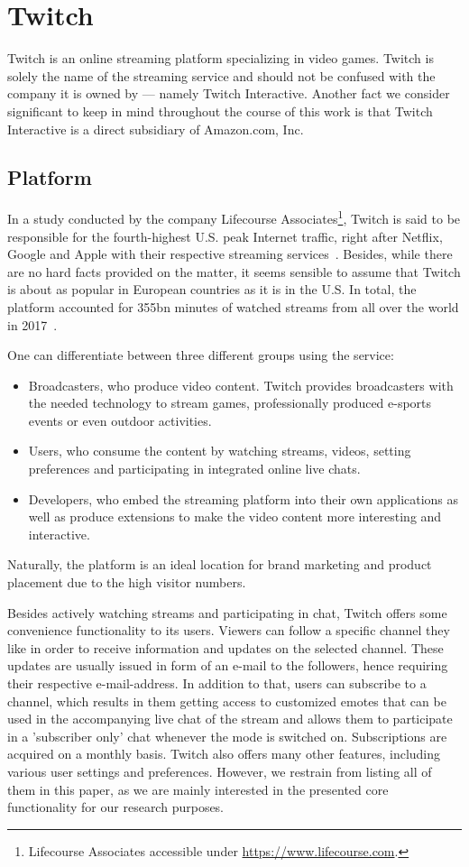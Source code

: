 \section{Twitch}
Twitch is an online streaming platform specializing in video games. 
Twitch is solely the name of the streaming service and should not be confused with the company it is owned by --- namely Twitch Interactive. Another fact we consider significant to keep in mind throughout the course of this work is that Twitch Interactive is a direct subsidiary of Amazon.com, Inc. 

\subsection{Platform}
In a study conducted by the company Lifecourse Associates\footnote{Lifecourse Associates accessible under \url{https://www.lifecourse.com}. }, Twitch is said to be responsible for the fourth-highest U.S. peak Internet traffic, right after Netflix, Google and Apple with their respective streaming services~\cite{twitch-survey}. Besides, while there are no hard facts provided on the matter, it seems sensible to assume that Twitch is about as popular in European countries as it is in the U.S. In total, the platform accounted for 355bn minutes of watched streams from all over the world in 2017~\cite{twitch-minutes-watched}. 

One can differentiate between three different groups using the service: 
\begin{itemize}
	\item Broadcasters, who produce video content. Twitch provides broadcasters with the needed technology to stream games, professionally produced e-sports events or even outdoor activities.
	\item Users, who consume the content by watching streams, videos, setting preferences and participating in integrated online live chats. 
	\item Developers, who embed the streaming platform into their own applications as well as produce extensions to make the video content more interesting and interactive. 
\end{itemize}
Naturally, the platform is an ideal location for brand marketing and product placement due to the high visitor numbers. 

Besides actively watching streams and participating in chat, Twitch offers some convenience functionality to its users. Viewers can follow a specific channel they like in order to receive information and updates on the selected channel. These updates are usually issued in form of an e-mail to the followers, hence requiring their respective e-mail-address. In addition to that, users can subscribe to a channel, which results in them getting access to customized emotes that can be used in the accompanying live chat of the stream and allows them to participate in a 'subscriber only' chat whenever the mode is switched on. Subscriptions are acquired on a monthly basis. Twitch also offers many other features, including various user settings and preferences. However, we restrain from listing all of them in this paper, as we are mainly interested in the presented core functionality for our research purposes. 

